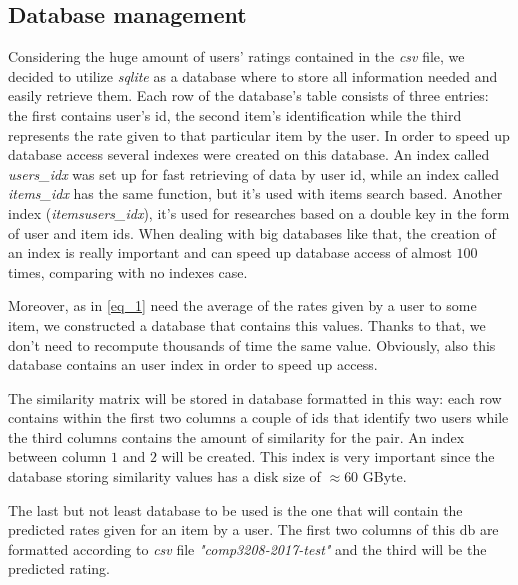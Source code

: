 \subsection{Database management}

Considering the huge amount of users' ratings contained in the \textit{csv} file, we decided to utilize \textit{sqlite} as a database where to store all information needed and easily retrieve them. Each row of the database's table consists of three entries: the first contains user's id, the second item's identification while the third represents the rate given to that particular item by the user. In order to speed up database access several indexes were created on this database. An index called \textit{users\_idx} was set up for fast retrieving of data by user id, while an index called \textit{items\_idx} has the same function, but it's used with items search based. Another index (\textit{itemsusers\_idx}), it's used for researches based on a double key in the form of user and item ids. When dealing with big databases like that, the creation of an index is really important and can speed up database access of almost $100$ times, comparing with no indexes case.

Moreover, as in \ref{eq_1} need the average of the rates given by a user to some item, we constructed a database that contains this values. Thanks to that, we don't need to recompute thousands of time the same value. Obviously, also this database contains an user index in order to speed up access. 

The similarity matrix will be stored in database formatted in this way: each row contains within the first two columns a couple of ids that identify two users while the third columns contains the amount of similarity for the pair. An index between column $1$ and $2$ will be created. This index is very important since the database storing similarity values has a disk size of $\approx 60$ GByte. 

The last but not least database to be used is the one that will contain the predicted rates given for an item by a user. The first two columns of this db are formatted according to \textit{csv} file \textit{"comp3208-2017-test"} and the third will be the predicted rating. 

